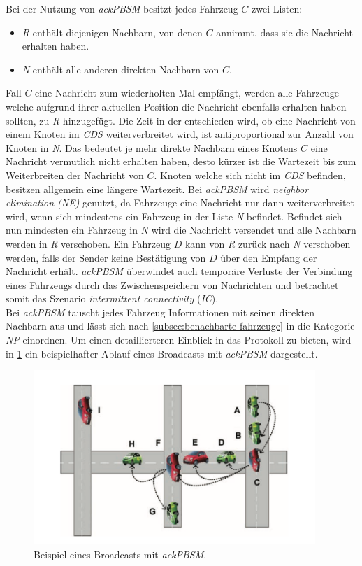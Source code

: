 \documentclass[english,runningheads,a4paper]{llncs}[2018/03/10]
\begin{document}
Bei der Nutzung von \textit{ackPBSM} besitzt jedes Fahrzeug $C$ zwei Listen:
\begin{itemize}
  \item \textit{R} enthält diejenigen Nachbarn, von denen $C$ annimmt, dass sie die Nachricht erhalten haben.
  \item \textit{N} enthält alle anderen direkten Nachbarn von $C$.
\end{itemize}
Fall $C$ eine Nachricht zum wiederholten Mal empfängt, werden alle Fahrzeuge welche aufgrund ihrer aktuellen Position die Nachricht ebenfalls erhalten haben sollten, zu \textit{R} hinzugefügt.
Die Zeit in der entschieden wird, ob eine Nachricht von einem Knoten im \textit{CDS} weiterverbreitet wird, ist antiproportional zur Anzahl von Knoten in \textit{N}.
Das bedeutet je mehr direkte Nachbarn eines Knotens $C$ eine Nachricht vermutlich nicht erhalten haben, desto kürzer ist die Wartezeit bis zum Weiterbreiten der Nachricht von $C$.
Knoten welche sich nicht im \textit{CDS} befinden, besitzen allgemein eine längere Wartezeit.
Bei \textit{ackPBSM} wird \textit{neighbor elimination (NE)} genutzt, da Fahrzeuge eine Nachricht nur dann weiterverbreitet wird, wenn sich mindestens ein Fahrzeug in der Liste \textit{N} befindet.
Befindet sich nun mindesten ein Fahrzeug in \textit{N} wird die Nachricht versendet und alle Nachbarn werden in \textit{R} verschoben.
Ein Fahrzeug $D$ kann von \textit{R} zurück nach \textit{N} verschoben werden, falls der Sender keine Bestätigung von $D$ über den Empfang der Nachricht erhält.
\textit{ackPBSM} überwindet auch temporäre Verluste der Verbindung eines Fahrzeugs durch das Zwischenspeichern von Nachrichten und betrachtet somit das Szenario \textit{intermittent connectivity} (\textit{IC})\cite{conti2013mobile}.\\
Bei \textit{ackPBSM} tauscht jedes Fahrzeug Informationen mit seinen direkten Nachbarn aus und lässt sich nach \ref{subsec:benachbarte-fahrzeuge} in die Kategorie \textit{NP} einordnen.
Um einen detaillierteren Einblick in das Protokoll zu bieten, wird in \ref{fig:ackpbsm-example} ein beispielhafter Ablauf eines Broadcasts mit \textit{ackPBSM} dargestellt.

\begin{figure}[h]
  \centering
  \includegraphics[width=0.95\textwidth]{images/ackpbsm-example.png}
  \caption{Beispiel eines Broadcasts mit \textit{ackPBSM}\cite{conti2013mobile}.}
  \label{fig:ackpbsm-example}
\end{figure}
\end{document}
